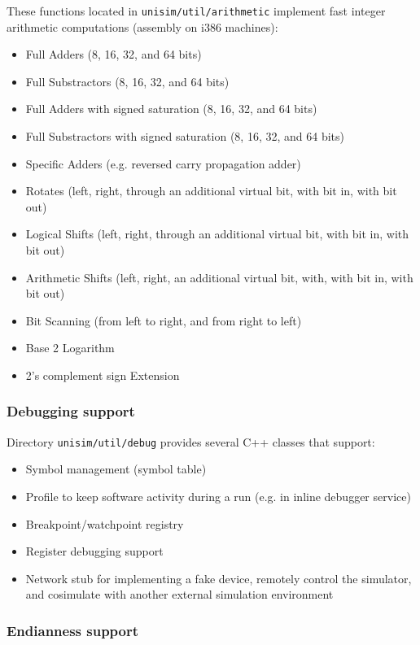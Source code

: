 These functions located in \texttt{unisim/util/arithmetic} implement fast integer arithmetic computations (assembly on i386 machines):
\begin{itemize}
\item Full Adders (8, 16, 32, and 64 bits)
\item Full Substractors (8, 16, 32, and 64 bits)
\item Full Adders with signed saturation (8, 16, 32, and 64 bits)
\item Full Substractors with signed saturation (8, 16, 32, and 64 bits)
\item Specific Adders (e.g. reversed carry propagation adder)
\item Rotates (left, right, through an additional virtual bit, with bit in, with bit out)
\item Logical Shifts (left, right, through an additional virtual bit, with bit in, with bit out)
\item Arithmetic Shifts (left, right, an additional virtual bit, with, with bit in, with bit out)
\item Bit Scanning (from left to right, and from right to left)
\item Base 2 Logarithm
\item 2's complement sign Extension
\end{itemize}

\subsubsection{Debugging support}

Directory \texttt{unisim/util/debug} provides several C++ classes that support:
\begin{itemize}
\item Symbol management (symbol table)
\item Profile to keep software activity during a run (e.g. in inline debugger service)
\item Breakpoint/watchpoint registry
\item Register debugging support
\item Network stub for implementing a fake device, remotely control the simulator, and cosimulate with another external simulation environment
\end{itemize}

\subsubsection{Endianness support}


